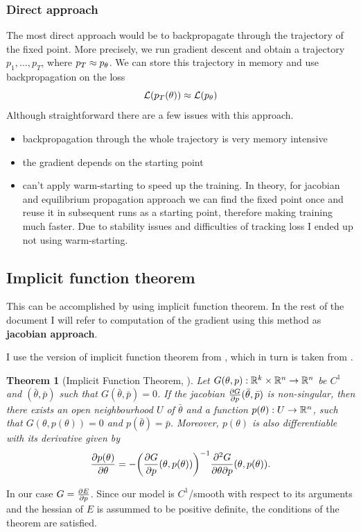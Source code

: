 \documentclass[a4paper,10pt]{report}
\newtheorem{theorem}{Theorem}
\begin{document}
\subsubsection{Direct approach}
The most direct approach would be to backpropagate through the trajectory of the fixed point. More precisely, we run gradient descent and obtain a trajectory $p_1, \ldots, p_T$, where $p_T \approx p_\theta$. We can store this trajectory in memory and use backpropagation on the loss
\begin{equation}
 \mathcal{L}(p_T(\theta)) \approx \mathcal{L}(p_\theta)
\end{equation}
Although straightforward there are a few issues with this approach.
\begin{itemize}
 \item backpropagation through the whole trajectory is very memory intensive
 \item the gradient depends on the starting point
 \item can't apply warm-starting to speed up the training. In theory, for jacobian and equilibrium propagation approach we can find the fixed point once and reuse it in subsequent runs as a starting point, therefore making training much faster.
 Due to stability issues and difficulties of tracking loss I ended up not using warm-starting.
\end{itemize}


\subsection{Implicit function theorem}
This can be accomplished by using implicit function theorem. In the rest of the document I will refer to computation of the gradient using this method as \textbf{jacobian approach}.

I use the version of implicit function theorem from \cite{zucchet2022beyond}, which in turn is taken from \cite{dontchev2009implicit}.
\begin{theorem}[Implicit Function Theorem, \cite{zucchet2022beyond} ]
Let $G(\theta, p): \mathbb{R}^k \times \mathbb{R}^n \to \mathbb{R}^n$ be $C^1$ and $(\bar{\theta}, \bar{p})$ such that $G(\bar{\theta},\bar{p})=0$. If the jacobian
$\frac{\partial G}{\partial p}(\bar{\theta},\bar{p})$ is non-singular, then there exists an open neighbourhood $U$ of $\bar{\theta} $ and a function $p(\theta):U \to \mathbb{R}^n$, such that $G(\theta, p(\theta)) = 0$ and $p(\bar{\theta}) = \bar{p}$. Moreover, $p(\theta)$ is also differentiable with
its derivative given by
\begin{equation}
\frac{\partial p(\theta)}{\partial \theta}= - \bigg(\frac{\partial G}{\partial p}(\theta, p(\theta))\bigg)^{-1} \frac{\partial^2 G}{\partial \theta \partial p}(\theta, p(\theta)).
\end{equation}

\end{theorem}
In our case $G = \frac{\partial E}{\partial p}$. Since our model is $C^1$/smooth with respect to its arguments and the hessian of $E$ is assummed to be positive definite, the conditions of the theorem are satisfied.
\end{document}
